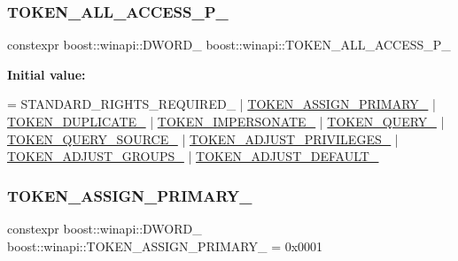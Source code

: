 \subsubsection{\texorpdfstring{T\+O\+K\+E\+N\+\_\+\+A\+L\+L\+\_\+\+A\+C\+C\+E\+S\+S\+\_\+\+P\+\_\+}{TOKEN\_ALL\_ACCESS\_P\_}}
{\footnotesize\ttfamily constexpr boost\+::winapi\+::\+D\+W\+O\+R\+D\+\_\+ boost\+::winapi\+::\+T\+O\+K\+E\+N\+\_\+\+A\+L\+L\+\_\+\+A\+C\+C\+E\+S\+S\+\_\+\+P\+\_\+}

{\bfseries Initial value\+:}
\begin{DoxyCode}
= STANDARD\_RIGHTS\_REQUIRED\_  |
        \mbox{\hyperlink{namespaceboost_1_1winapi_a13cefc4e4a8bd197ce2fa95ce25f47e4}{TOKEN\_ASSIGN\_PRIMARY\_}}  | \mbox{\hyperlink{namespaceboost_1_1winapi_a24320c5b14eb3b2076bb80b310d69e28}{TOKEN\_DUPLICATE\_}}          |
        \mbox{\hyperlink{namespaceboost_1_1winapi_acf614cf0385c34f998b17e1a4aac2f5a}{TOKEN\_IMPERSONATE\_}}        | \mbox{\hyperlink{namespaceboost_1_1winapi_aa8d690e5577abdf2d156cbcda5cf23fb}{TOKEN\_QUERY\_}}              |
        \mbox{\hyperlink{namespaceboost_1_1winapi_af504352b775da9ed41d3e8d451fb60b2}{TOKEN\_QUERY\_SOURCE\_}}      | \mbox{\hyperlink{namespaceboost_1_1winapi_ae421c93ef942bc0c7728ecd495a19208}{TOKEN\_ADJUST\_PRIVILEGES\_}}  |
        \mbox{\hyperlink{namespaceboost_1_1winapi_a5bceb0371395d6c4af2c6fd537a9df1c}{TOKEN\_ADJUST\_GROUPS\_}}    | \mbox{\hyperlink{namespaceboost_1_1winapi_a392915600d4ba82203d0ac72f10e8563}{TOKEN\_ADJUST\_DEFAULT\_}}
\end{DoxyCode}
\mbox{\label{namespaceboost_1_1winapi_a13cefc4e4a8bd197ce2fa95ce25f47e4}} 
\subsubsection{\texorpdfstring{T\+O\+K\+E\+N\+\_\+\+A\+S\+S\+I\+G\+N\+\_\+\+P\+R\+I\+M\+A\+R\+Y\+\_\+}{TOKEN\_ASSIGN\_PRIMARY\_}}
{\footnotesize\ttfamily constexpr boost\+::winapi\+::\+D\+W\+O\+R\+D\+\_\+ boost\+::winapi\+::\+T\+O\+K\+E\+N\+\_\+\+A\+S\+S\+I\+G\+N\+\_\+\+P\+R\+I\+M\+A\+R\+Y\+\_\+ = 0x0001}

\mbox{\label{namespaceboost_1_1winapi_a24320c5b14eb3b2076bb80b310d69e28}} 
